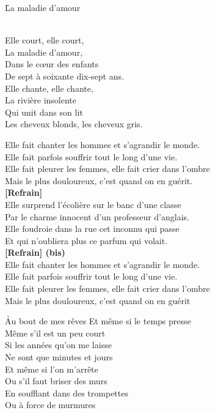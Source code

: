 \documentclass{novel}
\begin{document}
\newpage
\normalsize
\h*{La maladie d’amour}
\begin{bfseries}
[Refrain:]\\
Elle court, elle court, \\
La maladie d'amour, \\
Dans le cœur des enfants \\
De sept à soixante dix-sept ans. \\
Elle chante, elle chante, \\
La rivière insolente \\
Qui unit dans son lit \\
Les cheveux blonds, les cheveux gris. \\
\end{bfseries}

Elle fait chanter les hommes et s'agrandir le monde. \\
Elle fait parfois souffrir tout le long d'une vie. \\
Elle fait pleurer les femmes, elle fait crier dans l'ombre \\
Mais le plus douloureux, c'est quand on en guérit. \\

\textbf{[Refrain]}\\

Elle surprend l'écolière sur le banc d'une classe \\
Par le charme innocent d'un professeur d'anglais. \\
Elle foudroie dans la rue cet inconnu qui passe \\
Et qui n'oubliera plus ce parfum qui volait. \\

\textbf{[Refrain] (bis)}\\

Elle fait chanter les hommes et s'agrandir le monde. \\
Elle fait parfois souffrir tout le long d'une vie. \\
Elle fait pleurer les femmes, elle fait crier dans l’ombre \\
Mais le plus douloureux, c’est quand on en guérit

\newpage
\normalsize
\h*{Au bout de mes rêves}
Et même si le temps presse \\
Même s'il est un peu court \\
Si les années qu'on me laisse \\
Ne sont que minutes et jours \\
Et même si l'on m'arrête \\
Ou s'il faut briser des murs \\
En soufflant dans des trompettes \\
Ou à force de murmures \\
\end{document}
